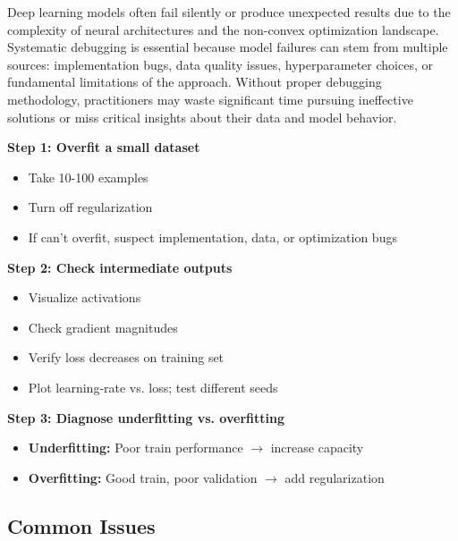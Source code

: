 Deep learning models often fail silently or produce unexpected results due to the complexity of neural architectures and the non-convex optimization landscape. Systematic debugging is essential because model failures can stem from multiple sources: implementation bugs, data quality issues, hyperparameter choices, or fundamental limitations of the approach. Without proper debugging methodology, practitioners may waste significant time pursuing ineffective solutions or miss critical insights about their data and model behavior.


\textbf{Step 1: Overfit a small dataset}
\begin{itemize}
    \item Take 10-100 examples
    \item Turn off regularization
    \item If can't overfit, suspect implementation, data, or optimization bugs
\end{itemize}

\textbf{Step 2: Check intermediate outputs}
\begin{itemize}
    \item Visualize activations
    \item Check gradient magnitudes
    \item Verify loss decreases on training set
    \item Plot learning-rate vs. loss; test different seeds
\end{itemize}

\textbf{Step 3: Diagnose underfitting vs. overfitting}
\begin{itemize}
    \item \textbf{Underfitting:} Poor train performance $\to$ increase capacity
    \item \textbf{Overfitting:} Good train, poor validation $\to$ add regularization
\end{itemize}

\subsection{Common Issues}

